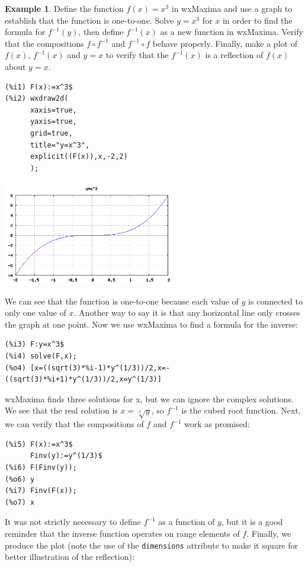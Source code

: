 \documentclass[10.5pt,twoside]{report}
\theoremstyle{definition}
\newtheorem{exmp}{Example}[section]
\begin{document}
\begin{exmp}
Define the function $f(x)=x^3$ in wxMaxima and use a graph to establish that the function is one-to-one.  Solve $y=x^3$  for $x$ in order to find the formula for $f^{-1}(y)$, then define $f^{-1}(x)$ as a new function in wxMaxima.  Verify that the compositions $f \circ f^{-1}$ and $f^{-1} \circ f$ behave properly.  Finally, make a plot of $f(x)$, $f^{-1}(x)$ and $y=x$ to verify that the $f^{-1}(x)$ is a reflection of $f(x)$ about $y=x$.\\

\begin{verbatim}
(%i1) F(x):=x^3$
(%i2) wxdraw2d(
      xaxis=true,
      yaxis=true,
      grid=true,
      title="y=x^3",
      explicit((F(x)),x,-2,2)
      ); 
\end{verbatim}
\includegraphics[width=3in]{example_2_4_1_1}

We can see that the function is one-to-one because each value of $y$ is connected to only one value of $x$.  Another way to say it is that any horizontal line only crosses the graph at one point.  Now we use wxMaxima to find a formula for the inverse:

\begin{verbatim}
(%i3) F:y=x^3$
(%i4) solve(F,x);
(%o4) [x=((sqrt(3)*%i-1)*y^(1/3))/2,x=-((sqrt(3)*%i+1)*y^(1/3))/2,x=y^(1/3)]
\end{verbatim}

wxMaxima finds three solutions for x, but we can ignore the complex solutions.  We see that the real solution is $x=\sqrt[3]{y}$, so $f^{-1}$ is the cubed root function.  Next, we can verify that the compositions of $f$ and $f^{-1}$ work as promised:

\begin{verbatim}
(%i5) F(x):=x^3$
      Finv(y):=y^(1/3)$
(%i6) F(Finv(y));
(%o6) y
(%i7) Finv(F(x));
(%o7) x
\end{verbatim}

It was not strictly necessary to define $f^{-1}$ as a function of $y$, but it is a good reminder that the inverse function operates on range elements of $f$.  Finally, we produce the plot (note the use of the \verb|dimensions| attribute to make it square for better illustration of the reflection):


\end{exmp}
\end{document}
